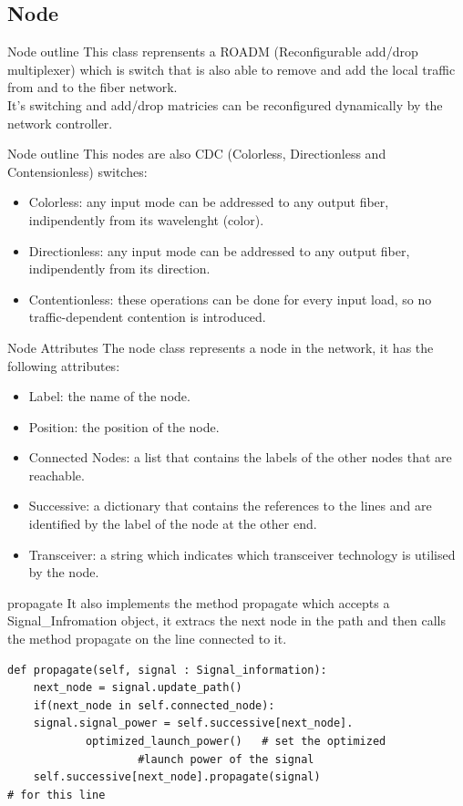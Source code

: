 \documentclass{beamer}
\begin{document}
	\subsection{Node}
	\begin{frame}{Node outline}
		This class reprensents a ROADM (Reconfigurable add/drop multiplexer) which is switch that is also able to remove and add the local traffic from and to the fiber network.\pause \\
		It's switching and add/drop matricies can be reconfigured dynamically by the network controller.
	\end{frame}
	\begin{frame}{Node outline}
		This nodes are also CDC (Colorless, Directionless and Contensionless) switches: \pause
		\begin{itemize}
			\item Colorless: any input mode can be addressed to any output fiber, indipendently from its wavelenght (color).\pause
			\item Directionless: any input mode can be addressed to any output fiber, indipendently from its direction.\pause
			\item Contentionless: these operations can be done for every input load, so no traffic-dependent contention is introduced.
		\end{itemize}
	\end{frame}
	\begin{frame}{Node Attributes}
		The node class represents a node in the network, it has the following attributes:
		\begin{itemize}
			\item Label: the name of the node.
			\item Position: the position of the node.
			\item Connected Nodes: a list that contains the labels of the other nodes that are reachable.
			\item Successive: a dictionary that contains the references to the lines and are identified by the label of the node at the other end.
			\item Transceiver: a string which indicates which transceiver technology is utilised by the node.
		\end{itemize}
	\end{frame}
	\begin{frame}[fragile]{propagate}
		It also implements the method propagate which accepts a Signal\_Infromation object, it extracs the next node in the path and then calls the method propagate on the line connected to it.
		\begin{verbatim}
def propagate(self, signal : Signal_information):
	next_node = signal.update_path()
	if(next_node in self.connected_node):
	signal.signal_power = self.successive[next_node].
			optimized_launch_power()   # set the optimized 
					#launch power of the signal
	self.successive[next_node].propagate(signal)                                # for this line

		\end{verbatim}
	\end{frame}
\end{document}
